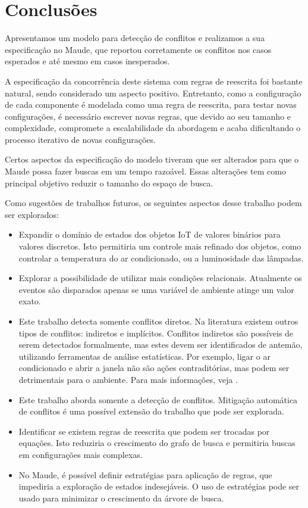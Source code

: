 \section{Conclusões} \label{sec:chap7}
Apresentamos um modelo para detecção de conflitos e realizamos a sua especificação no Maude, que reportou corretamente os conflitos nos casos esperados e até mesmo em casos inesperados.

A especificação da concorrência deste sistema com regras de reescrita foi bastante natural, sendo considerado um aspecto positivo. Entretanto, como a configuração de cada componente é modelada como uma regra de reescrita, para testar novas configurações, é necessário escrever novas regras, que devido ao seu tamanho e complexidade, compromete a escalabilidade da abordagem e acaba dificultando o processo iterativo de novas configurações.

Certos aspectos da especificação do modelo tiveram que ser alterados para que o Maude possa fazer buscas em um tempo razoável. Essas alterações tem como principal objetivo reduzir o tamanho do espaço de busca.

Como sugestões de trabalhos futuros, os seguintes aspectos desse trabalho podem ser explorados:
\begin{itemize}
  \item Expandir o domínio de estados dos objetos IoT de valores binários para valores discretos. Isto permitiria um controle mais refinado dos objetos, como controlar a temperatura do ar condicionado, ou a luminosidade das lâmpadas.
  \item Explorar a possibilidade de utilizar mais condições relacionais. Atualmente os eventos são disparados apenas se uma variável de ambiente atinge um valor exato.
  \item Este trabalho detecta somente conflitos diretos. Na literatura existem outros tipos de conflitos: indiretos e implícitos. Conflitos indiretos são possíveis de serem detectados formalmente, mas estes devem ser identificados de antemão, utilizando ferramentas de análise estatísticas. Por exemplo, ligar o ar condicionado e abrir a janela não são ações contraditórias, mas podem ser detrimentais para o ambiente. Para mais informações, veja \cite{ConflictDetectionORAN}.
  \item Este trabalho aborda somente a detecção de conflitos. Mitigação automática de conflitos é uma possível extensão do trabalho que pode ser explorada.
  \item Identificar se existem regras de reescrita que podem ser trocadas por equações. Isto reduziria o crescimento do grafo de busca e permitiria buscas em configurações mais complexas.
  \item No Maude, é possível definir estratégias para aplicação de regras, que impediria a exploração de estados indesejáveis. O uso de estratégias pode ser usado para minimizar o crescimento da árvore de busca. \cite{MaudeExplanation}
\end{itemize}